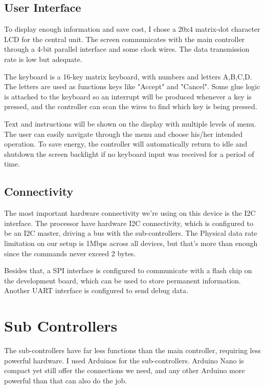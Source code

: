 \documentclass{article}
\begin{document}
\subsection{User Interface}
\par To display enough information and save cost, I chose a 20x4 matrix-dot character LCD for the central unit. The screen communicates with the main controller through a 4-bit parallel interface and some clock wires. The data transmission rate is low but adequate.

\par The keyboard is a 16-key matrix keyboard, with numbers and letters A,B,C,D. The letters are used as functions keys like "Accept" and "Cancel". Some glue logic is attached to the keyboard so an interrupt will be produced whenever a key is pressed, and the controller can scan the wires to find which key is being pressed.

\par Text and instructions will be shown on the display with multiple levels of menu. The user can easily navigate through the menu and choose his/her intended operation. To save energy, the controller will automatically return to idle and shutdown the screen backlight if no keyboard input was received for a period of time.

\subsection{Connectivity}
\par The most important hardware connectivity we're using on this device is the I2C interface. The processor have hardware I2C connectivity, which is configured to be an I2C master, driving a bus with the sub-controllers. The Physical data rate limitation on our setup is 1Mbps across all devices, but that's more than enough since the commands never exceed 2 bytes.

\par Besides that, a SPI interface is configured to communicate with a flash chip on the development board, which can be used to store permanent information. Another UART interface is configured to send debug data.

\section{Sub Controllers}
\par The sub-controllers have far less functions than the main controller, requiring less powerful hardware. I used Arduinos for the sub-controllers. Arduino Nano is compact yet still offer the connections we need, and any other Arduino more powerful than that can also do the job.
\end{document}
